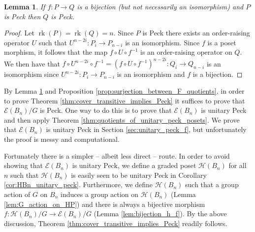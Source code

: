 \documentclass[10 pt]{amsart}
\theoremstyle{plain}
\newtheorem{lem}[thm]{Lemma}
\theoremstyle{definition}
\theoremstyle{remark}
\numberwithin{equation}{section}
\newcommand\rk{\operatorname{rk}}
\begin{document}
\begin{lem}\label{lem:bijection_peck_implication}
If $f:P\rightarrow Q$ is a bijection (but not necessarily an isomorphism) and $P$ is Peck then $Q$ is Peck.
\end{lem}
\begin{proof}
Let $\rk(P) = \rk(Q) = n$.  Since $P$ is Peck there exists an order-raising operator $U$ such that $U^{n-2i}\colon P_i\rightarrow P_{n-i}$ is an isomorphism.  Since $f$ is a poset morphism, it follows that the map $f\circ U\circ f^{-1}$ is an order-raising operator on $Q$.  We then have that $f\circ U^{n-2i}\circ f^{-1} = \left(f\circ U\circ f^{-1}\right)^{n-2i}\colon Q_i\rightarrow Q_{n-i}$ is an isomorphism since $U^{n-2i}\colon P_i\rightarrow P_{n-i}$ is an isomorphism and $f$ is a bijection.

\end{proof}

By Lemma \ref{lem:bijection_peck_implication} and Proposition \ref{prop:surjection_between_F_quotients}, in order to prove Theorem \ref{thm:cover_transitive_implies_Peck} it suffices to prove that $\mathcal E(B_n)/G$ is Peck.  One way to do this is to prove that $\mathcal E(B_n)$ is unitary Peck and then apply Theorem \ref{thm:quotients_of_unitary_peck_posets}. We prove that $\mathcal E(B_n)$ is unitary Peck in Section \ref{sec:unitary_peck_f}, but unfortunately the proof is messy and computational.



Fortunately there is a simpler -- albeit less direct -- route.  In order to avoid showing that $\mathcal E(B_n)$ is unitary Peck, we define a graded poset $\mathcal{H}(B_n)$ for all $n$ such that $\mathcal{H}(B_n)$ is easily seen to be unitary Peck in Corollary \ref{cor:HBn_unitary_peck}. Furthermore, we define $\mathcal{H}(B_n)$ such that a group action of $G$ on $B_n$ induces a group action on $\mathcal{H}(B_n)$ (Lemma \ref{lem:G_action_on_HP}) and there is always a bijective morphism $f\colon \mathcal{H}(B_n)/G\rightarrow \mathcal E(B_n)/G$ (Lemma \ref{lem:bijection_h_f}).  By the above discussion, Theorem \ref{thm:cover_transitive_implies_Peck} readily follows.
\end{document}
